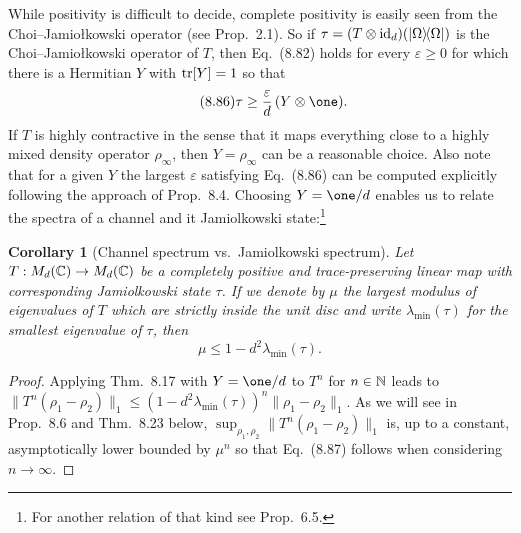\documentclass[11pt,a4paper]{article}
\theoremstyle{plain}
\newtheorem{corollary}{Corollary}[section]
\theoremstyle{definition}
\theoremstyle{remark}
\begin{document}
While positivity is difficult to decide, complete positivity is easily seen from the Choi--Jamio\l{}kowski operator (see Prop.~2.1). So if
$\tau=(T\otimes \mathrm{id}_d)(|\Omega\rangle\!\langle\Omega|)$ is the Choi--Jamio\l{}kowski operator of $T$, then Eq.~(8.82) holds for every $\varepsilon\ge 0$ for which there is a Hermitian $Y$ with $\operatorname{tr}[Y]=1$ so that
\begin{equation}\tag{8.86}
    \tau \ge \frac{\varepsilon}{d}\,(Y\otimes \one).
\end{equation}
If $T$ is highly contractive in the sense that it maps everything close to a highly mixed density operator $\rho_\infty$, then $Y=\rho_\infty$ can be a reasonable choice.
Also note that for a given $Y$ the largest $\varepsilon$ satisfying Eq.~(8.86) can be computed explicitly following the approach of Prop.~8.4.
Choosing $Y=\one/d$ enables us to relate the spectra of a channel and it Jamiolkowski state:\footnote{For another relation of that kind see Prop.~6.5.}

\begin{corollary}[Channel spectrum vs.\ Jamiolkowski spectrum]
    Let $T:M_d(\mathbb{C})\to M_d(\mathbb{C})$ be a completely positive and trace-preserving linear map with corresponding Jamiolkowski state $\tau$.
    If we denote by $\mu$ the largest modulus of eigenvalues of $T$ which are strictly inside the unit disc and write $\lambda_{\min}(\tau)$ for the smallest eigenvalue of $\tau$, then
    \begin{equation}\tag{8.87}
        \mu \le 1-d^2\lambda_{\min}(\tau).
    \end{equation}
\end{corollary}

\begin{proof}
    Applying Thm.~8.17 with $Y=\one/d$ to $T^n$ for $n\in\mathbb{N}$ leads to
    $\|T^n(\rho_1-\rho_2)\|_1 \le (1-d^2\lambda_{\min}(\tau))^n\|\rho_1-\rho_2\|_1$.
    As we will see in Prop.~8.6 and Thm.~8.23 below, $\sup_{\rho_1,\rho_2}\|T^n(\rho_1-\rho_2)\|_1$ is, up to a constant, asymptotically lower bounded by $\mu^n$ so that Eq.~(8.87) follows when considering $n\to\infty$.
\end{proof}
\end{document}
